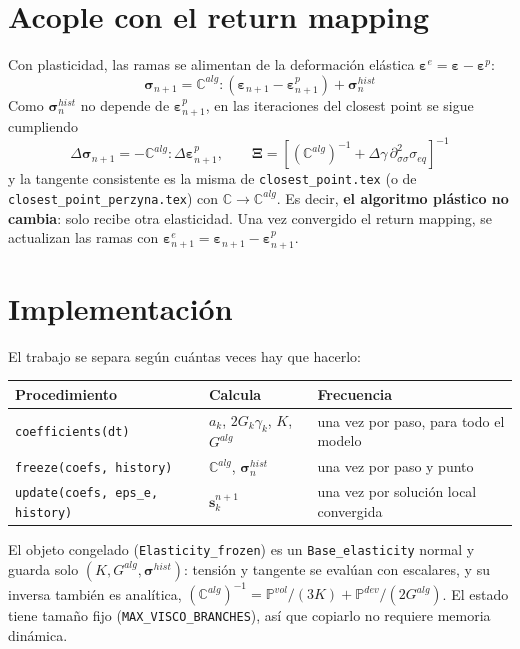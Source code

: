 \documentclass[12pt]{article}
\begin{document}
\section*{Acople con el return mapping}

Con plasticidad, las ramas se alimentan de la deformación elástica $\pmb{\varepsilon}^e = \pmb{\varepsilon} - \pmb{\varepsilon}^p$:
\[ \pmb{\sigma}_{n+1} = \mathbb{C}^{alg} : \left(\pmb{\varepsilon}_{n+1} - \pmb{\varepsilon}^p_{n+1}\right) + \pmb{\sigma}^{hist}_n \]
Como $\pmb{\sigma}^{hist}_n$ no depende de $\pmb{\varepsilon}^p_{n+1}$, en las iteraciones del closest point se sigue cumpliendo
\[ \Delta\pmb{\sigma}_{n+1} = -\mathbb{C}^{alg} : \Delta\pmb{\varepsilon}^p_{n+1}, \qquad
   \pmb{\Xi} = \left[\left(\mathbb{C}^{alg}\right)^{-1} + \Delta\gamma\,\partial^2_{\sigma\sigma}\sigma_{eq}\right]^{-1} \]
y la tangente consistente es la misma de \texttt{closest\_point.tex} (o de \texttt{closest\_point\_perzyna.tex}) con $\mathbb{C} \to \mathbb{C}^{alg}$. Es decir, \textbf{el algoritmo plástico no cambia}: solo recibe otra elasticidad. Una vez convergido el return mapping, se actualizan las ramas con $\pmb{\varepsilon}^e_{n+1} = \pmb{\varepsilon}_{n+1} - \pmb{\varepsilon}^p_{n+1}$.

\section*{Implementación}

El trabajo se separa según cuántas veces hay que hacerlo:
\begin{center}
\renewcommand\arraystretch{1.4}
\begin{tabular}{lll}
    Procedimiento & Calcula & Frecuencia \\ \hline
    \texttt{coefficients(dt)} & $a_k$, $2G_k\gamma_k$, $K$, $G^{alg}$ & una vez por paso, para todo el modelo \\
    \texttt{freeze(coefs, history)} & $\mathbb{C}^{alg}$, $\pmb{\sigma}^{hist}_n$ & una vez por paso y punto \\
    \texttt{update(coefs, eps\_e, history)} & $\pmb{s}_k^{n+1}$ & una vez por solución local convergida \\
\end{tabular}
\end{center}
El objeto congelado (\texttt{Elasticity\_frozen}) es un \texttt{Base\_elasticity} normal y guarda solo $(K, G^{alg}, \pmb{\sigma}^{hist})$: tensión y tangente se evalúan con escalares, y su inversa también es analítica, $\left(\mathbb{C}^{alg}\right)^{-1} = \mathbb{P}^{vol}/(3K) + \mathbb{P}^{dev}/(2G^{alg})$. El estado tiene tamaño fijo (\texttt{MAX\_VISCO\_BRANCHES}), así que copiarlo no requiere memoria dinámica.
\end{document}
